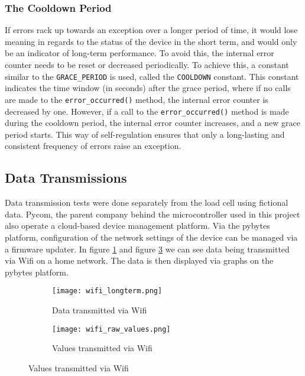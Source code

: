 \subsubsection{The Cooldown Period}
If errors rack up towards an exception over a longer period of time, it would lose meaning in regards to the status of the device in the short term, and would only be an indicator of long-term performance. To avoid this, the internal error counter needs to be reset or decreased periodically. To achieve this, a constant similar to the \lstinline{GRACE_PERIOD} is used, called the \lstinline{COOLDOWN} constant. This constant indicates the time window (in seconds) after the grace period, where if no calls are made to the \lstinline{error_occurred()} method, the internal error counter is decreased by one. However, if a call to the \lstinline{error_occurred()} method is made during the cooldown period, the internal error counter increases, and a new grace period starts. This way of self-regulation ensures that only a long-lasting and consistent frequency of errors raise an exception.


\subsection{Data Transmissions}
Data transmission tests were done separately from the load cell using fictional data. Pycom, the parent company behind the microcontroller used in this project also operate a cloud-based device management platform. \cite{pybytes-website} Via the pybytes platform, configuration of the network settings of the device can be managed via a firmware updater. 
In figure \ref{fig:wifi_longterm} and figure \ref{fig:wifi_raw_values} we can see data being transmitted via Wifi on a home network. The data is then displayed via graphs on the pybytes platform.

\begin{figure}[H]
\centering
	\begin{subfigure}[b]{0.4\textwidth}
    \texttt{[image: wifi\_longterm.png]}
    \caption{Data transmitted via Wifi}
    \label{fig:wifi_longterm}
	\end{subfigure}
	\begin{subfigure}[b]{0.4\textwidth}
    \texttt{[image: wifi\_raw\_values.png]}
    \caption{Values transmitted via Wifi}
    \label{fig:wifi_raw_values}
	\end{subfigure}
\end{figure}

